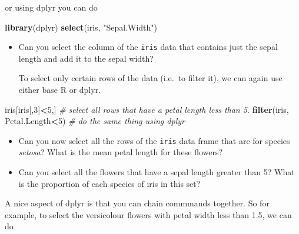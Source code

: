 \documentclass[
]{book}
\newenvironment{Shaded}{\begin{snugshade}}{\end{snugshade}}
\newcommand{\CommentTok}[1]{\textcolor[rgb]{0.56,0.35,0.01}{\textit{#1}}}
\newcommand{\DecValTok}[1]{\textcolor[rgb]{0.00,0.00,0.81}{#1}}
\newcommand{\FunctionTok}[1]{\textcolor[rgb]{0.13,0.29,0.53}{\textbf{#1}}}
\newcommand{\NormalTok}[1]{#1}
\newcommand{\SpecialCharTok}[1]{\textcolor[rgb]{0.81,0.36,0.00}{\textbf{#1}}}
\newcommand{\StringTok}[1]{\textcolor[rgb]{0.31,0.60,0.02}{#1}}
\theoremstyle{definition}
\theoremstyle{definition}
\theoremstyle{definition}
\theoremstyle{definition}
\theoremstyle{remark}
\begin{document}
\begin{Shaded}
\end{Shaded}

or using dplyr you can do

\begin{Shaded}
\begin{Highlighting}[]
\FunctionTok{library}\NormalTok{(dplyr)}
\FunctionTok{select}\NormalTok{(iris, }\StringTok{"Sepal.Width"}\NormalTok{)}
\end{Highlighting}
\end{Shaded}

\begin{itemize}
\item
  Can you select the column of the \texttt{iris} data that contains just the sepal length and add it to the sepal width?

  To select only certain rows of the data (i.e.~to filter it), we can again use either base R or dplyr.
\end{itemize}

\begin{Shaded}
\begin{Highlighting}[]
\NormalTok{iris[iris[,}\DecValTok{3}\NormalTok{]}\SpecialCharTok{\textless{}}\DecValTok{5}\NormalTok{,] }
\CommentTok{\# select all rows that have a petal length less than 5.}
\FunctionTok{filter}\NormalTok{(iris, Petal.Length}\SpecialCharTok{\textless{}}\DecValTok{5}\NormalTok{) }\CommentTok{\# do the same thing using dplyr}
\end{Highlighting}
\end{Shaded}

\begin{itemize}
\item
  Can you now select all the rows of the \texttt{iris} data frame that are for species \emph{setosa}? What is the mean petal length for these flowers?
\item
  Can you select all the flowers that have a sepal length greater than 5? What is the proportion of each species of iris in this set?
\end{itemize}

A nice aspect of dplyr is that you can chain commmands together. So for example, to select the versicolour flowers with petal width less than 1.5, we can do
\end{document}
